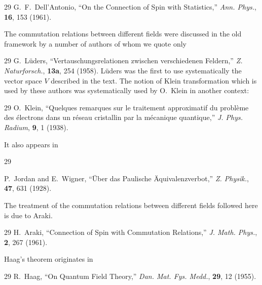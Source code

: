 \begin{thebibliography}{29}
\setcounter{NAT@ctr}{16}
 G.~F.~Dell'Antonio, ``On the Connection of Spin with Statistics,''
\emph{Ann. Phys.}, \textbf{16}, 153 (1961).
\end{thebibliography}

The commutation relations between different fields were discussed in the old
framework by a number of authors of whom we quote only

\begin{thebibliography}{29}
\setcounter{NAT@ctr}{17}
 G.~L\"uders, ``Vertauschungs\-relationen zwischen verschiedenen
Feldern,'' \emph{Z. Naturforsch.}, \textbf{13a}, 254 (1958). L\"uders was the
first to use systematically the vector space \(V\) described in the text. The
notion of Klein transformation which is used by these authors was
systematically used by O.~Klein in another context:
\end{thebibliography}

\begin{thebibliography}{29}
\setcounter{NAT@ctr}{18}
 O.~Klein, ``Quelques remarques sur le traitement approximatif du
probl\`eme des \'electrons dans un r\'eseau cristallin par la m\'ecanique
quantique,'' \emph{J. Phys. Radium}, \textbf{9}, 1 (1938).
\end{thebibliography}

It also appears in

\begin{thebibliography}{29}
\setcounter{NAT@ctr}{19}
\item[19a.] P.~Jordan and E.~Wigner, ``\"Uber das Paulische
\"Aquivalenzverbot,'' \emph{Z. Physik.}, \textbf{47}, 631 (1928).
\end{thebibliography}

The treatment of the commutation relations between different fields followed
here is due to Araki.

\begin{thebibliography}{29}
\setcounter{NAT@ctr}{19}
 H.~Araki, ``Connection of Spin with Commutation Relations,''
\emph{J. Math. Phys.}, \textbf{2}, 267 (1961).
\end{thebibliography}

Haag's theorem originates in

\begin{thebibliography}{29}
\setcounter{NAT@ctr}{20}
 R.~Haag, ``On Quantum Field Theory,'' \emph{Dan. Mat. Fys.
Medd.}, \textbf{29}, 12 (1955).
\end{thebibliography}


